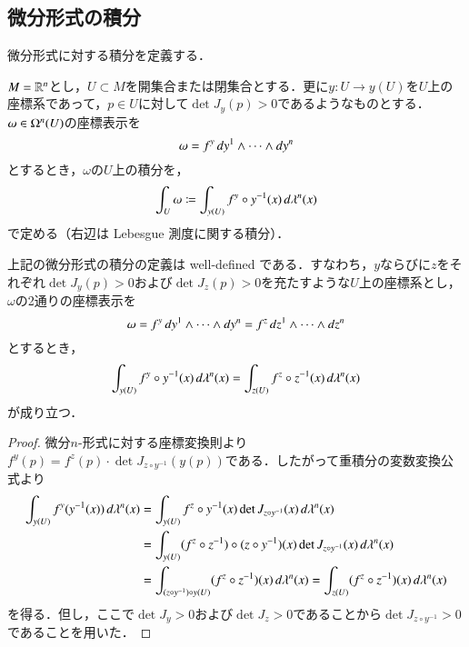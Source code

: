 \subsection{微分形式の積分}

微分形式に対する積分を定義する．

\begin{defi}
$M = \mathbb{R}^n$とし，$U \subset M$を開集合または閉集合とする．更に$y \colon U \to y(U)$を$U$上の座標系であって，$p \in U$に対して$\det J_y(p) > 0$であるようなものとする．$\omega \in \Omega^n(U)$の座標表示を
\begin{equation}
\omega = f^y \mathop{}\!d y^{1} \wedge \dots \wedge \mathop{}\!d y^{n}
\end{equation}とするとき，$\omega$の$U$上の積分を，
\begin{equation}
\int_U \omega \coloneqq \int_{y(U)} f^y \circ y^{-1} (x) \mathop{}\!d \lambda^n(x)
\end{equation}で定める（右辺は Lebesgue 測度に関する積分）．
\end{defi}

\begin{prop}
上記の微分形式の積分の定義は well-defined である．すなわち，$y$ならびに$z$をそれぞれ$\det J_y(p)>0$および$\det J_z(p) > 0$を充たすような$U$上の座標系とし，$\omega$の2通りの座標表示を
\begin{equation}
\omega = f^y \mathop{}\!d y^1 \wedge \dots \wedge \mathop{}\!d y^n = f^z \mathop{}\!d z^1 \wedge \dots \wedge \mathop{}\!d z^n
\end{equation}とするとき，
\begin{equation}
\int_{y(U)} f^y \circ y^{-1} (x) \mathop{}\!d \lambda^n(x) = \int_{z(U)} f^z \circ z^{-1} (x) \mathop{}\!d \lambda^n(x)
\end{equation}が成り立つ．
\end{prop}

\begin{proof}
微分$n$-形式に対する座標変換則より$f^y(p) = f^z(p) \cdot \det J_{z \circ y^{-1}}(y(p))$である．したがって重積分の変数変換公式より
\begin{align}
\int_{y(U)} f^y (y^{-1} (x)) \mathop{}\!d \lambda^n (x) &= \int_{y(U)} f^z \circ y^{-1} (x) \det J_{z \circ y^{-1}} (x) \mathop{}\!d \lambda^n (x) \\
&= \int_{y(U)} (f^z \circ z^{-1}) \circ (z \circ y^{-1}) (x) \det J_{z \circ y^{-1}} (x) \mathop{}\!d \lambda^n (x) \\
&= \int_{(z \circ y^{-1}) \circ y(U)} (f^z \circ z^{-1}) (x) \mathop{}\!d \lambda^n (x) = \int_{z(U)} (f^z \circ z^{-1}) (x) \mathop{}\!d \lambda^n (x)
\end{align}を得る．但し，ここで$\det J_y >0$および$\det J_z > 0$であることから$\det J_{z \circ y^{-1}} > 0$であることを用いた．
\end{proof}

